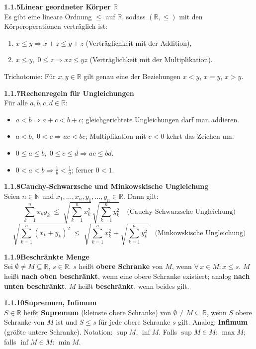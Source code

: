 \documentclass[a4paper,12pt]{article}
\newcommand{\gentry}[3]{%
  \noindent\textbf{#1\quad #2}\nopagebreak\\[0.2em]
  #3\par\smallskip
}
\begin{document}
\gentry{1.1.5}{Linear geordneter Körper $\mathbb{R}$}{%
  Es gibt eine lineare Ordnung $\leq$ auf $\mathbb{R}$, sodass $(\mathbb{R}, \leq)$ mit den
  Körperoperationen verträglich ist:
  \begin{enumerate}[label=(\roman*),topsep=2pt,itemsep=1pt]
    \item $x \leq y \Rightarrow x+z \leq y+z$ \quad (Verträglichkeit mit der Addition),
    \item $x \leq y,\; 0 \leq z \Rightarrow xz \leq yz$ \quad (Verträglichkeit mit der Multiplikation).
  \end{enumerate}
  Trichotomie: Für $x, y \in \mathbb{R}$ gilt genau eine der Beziehungen $x < y$, $x = y$, $x > y$.
}

\gentry{1.1.7}{Rechenregeln für Ungleichungen}{%
  Für alle $a, b, c, d \in \mathbb{R}$:
  \begin{itemize}[topsep=2pt,itemsep=1pt]
    \item $a < b \Rightarrow a+c < b+c$; gleichgerichtete Ungleichungen darf man addieren.
    \item $a < b,\; 0 < c \Rightarrow ac < bc$; Multiplikation mit $c < 0$ kehrt das Zeichen um.
    \item $0 \leq a \leq b,\; 0 \leq c \leq d \Rightarrow ac \leq bd$.
    \item $0 < a < b \Rightarrow \frac{1}{b} < \frac{1}{a}$; ferner $0 < 1$.
  \end{itemize}
}

\gentry{1.1.8}{Cauchy-Schwarzsche und Minkowskische Ungleichung}{%
  Seien $n \in \mathbb{N}$ und $x_1, \ldots, x_n, y_1, \ldots, y_n \in \mathbb{R}$. Dann gilt:
  \[
    \sum_{k=1}^n x_k y_k \;\leq\; \sqrt{\sum_{k=1}^n x_k^2}\,\sqrt{\sum_{k=1}^n y_k^2}
    \quad \text{(Cauchy-Schwarzsche Ungleichung)}
  \]
  \[
    \sqrt{\sum_{k=1}^n (x_k + y_k)^2} \;\leq\; \sqrt{\sum_{k=1}^n x_k^2} + \sqrt{\sum_{k=1}^n y_k^2}
    \quad \text{(Minkowskische Ungleichung)}
  \]
}

\gentry{1.1.9}{Beschränkte Menge}{%
  Sei $\emptyset \neq M \subseteq \mathbb{R}$, $s \in \mathbb{R}$.
  $s$ heißt \textbf{obere Schranke} von $M$, wenn $\forall\, x \in M: x \leq s$.
  $M$ heißt \textbf{nach oben beschränkt}, wenn eine obere Schranke existiert;
  analog \textbf{nach unten beschränkt}. $M$ heißt \textbf{beschränkt}, wenn beides gilt.
}

\gentry{1.1.10}{Supremum, Infimum}{%
  $S \in \mathbb{R}$ heißt \textbf{Supremum} (kleinste obere Schranke) von $\emptyset \neq M \subseteq \mathbb{R}$,
  wenn $S$ obere Schranke von $M$ ist und $S \leq s$ für jede obere Schranke $s$ gilt.
  Analog: \textbf{Infimum} (größte untere Schranke).
  Notation: $\sup M$, $\inf M$. Falls $\sup M \in M$: $\max M$; falls $\inf M \in M$: $\min M$.
}
\end{document}
